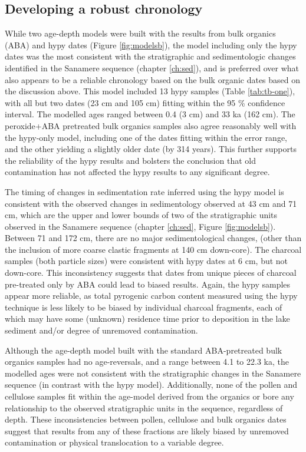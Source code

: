 \documentclass[
  12pt,
]{book}
\begin{document}
\hypertarget{developing-a-robust-chronology}{%
\subsection{Developing a robust chronology}\label{developing-a-robust-chronology}}

While two age-depth models were built with the results from bulk organics (ABA) and hypy dates (Figure \ref{fig:modelsb}), the model including only the hypy dates was the most consistent with the stratigraphic and sedimentologic changes identified in the Sanamere sequence (chapter \ref{ch:sed}), and is preferred over what also appears to be a reliable chronology based on the bulk organic dates based on the discussion above. This model included 13 hypy samples (Table \ref{tab:tb-one}), with all but two dates (23 cm and 105 cm) fitting within the 95 \% confidence interval. The modelled ages ranged between 0.4 (3 cm) and 33 ka (162 cm). The peroxide+ABA pretreated bulk organics samples also agree reasonably well with the hypy-only model, including one of the dates fitting within the error range, and the other yielding a slightly older date (by 314 years). This further supports the reliability of the hypy results and bolsters the conclusion that old contamination has not affected the hypy results to any significant degree.

The timing of changes in sedimentation rate inferred using the hypy model is consistent with the observed changes in sedimentology observed at 43 cm and 71 cm, which are the upper and lower bounds of two of the stratigraphic units observed in the Sanamere sequence (chapter \ref{ch:sed}, Figure \ref{fig:modelsb}). Between 71 and 172 cm, there are no major sedimentological changes, (other than the inclusion of more coarse clastic fragments at 140 cm down-core). The charcoal samples (both particle sizes) were consistent with hypy dates at 6 cm, but not down-core. This inconsistency suggests that dates from unique pieces of charcoal pre-treated only by ABA could lead to biased results. Again, the hypy samples appear more reliable, as total pyrogenic carbon content measured using the hypy technique is less likely to be biased by individual charcoal fragments, each of which may have some (unknown) residence time prior to deposition in the lake sediment and/or degree of unremoved contamination.

Although the age-depth model built with the standard ABA-pretreated bulk organics samples had no age-reversals, and a range between 4.1 to 22.3 ka, the modelled ages were not consistent with the stratigraphic changes in the Sanamere sequence (in contrast with the hypy model). Additionally, none of the pollen and cellulose samples fit within the age-model derived from the organics or bore any relationship to the observed stratigraphic units in the sequence, regardless of depth. These inconsistencies between pollen, cellulose and bulk organics dates suggest that results from any of these fractions are likely biased by unremoved contamination or physical translocation to a variable degree.
\end{document}
